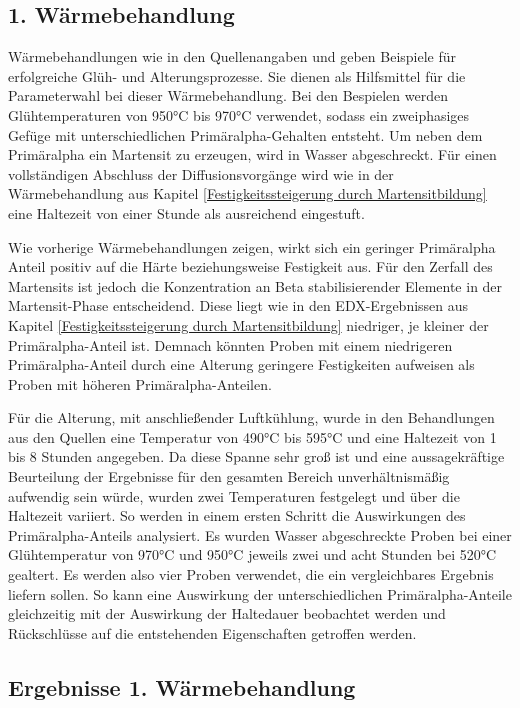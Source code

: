 \documentclass[a4paper, 11pt]{tubsreprt}
\begin{document}
\subsection{1. Wärmebehandlung}
Wärmebehandlungen wie in den Quellenangaben \cite{Gilbert2004} und \cite{Chen2008} geben Beispiele für erfolgreiche Glüh- und Alterungsprozesse. Sie dienen als Hilfsmittel für die Parameterwahl bei dieser Wärmebehandlung. Bei den Bespielen werden Glühtemperaturen von 950°C bis 970°C verwendet, sodass ein zweiphasiges Gefüge mit unterschiedlichen Primäralpha-Gehalten entsteht. Um neben dem Primäralpha ein Martensit zu erzeugen, wird in Wasser abgeschreckt. Für einen vollständigen Abschluss der Diffusionsvorgänge wird wie in der Wärmebehandlung aus Kapitel \ref{Festigkeitssteigerung durch Martensitbildung} eine Haltezeit von einer Stunde als ausreichend eingestuft.

Wie vorherige Wärmebehandlungen zeigen, wirkt sich ein geringer Primäralpha Anteil positiv auf die Härte beziehungsweise Festigkeit aus. Für den Zerfall des Martensits ist jedoch die Konzentration an Beta stabilisierender Elemente in der Martensit-Phase entscheidend. Diese liegt wie in den EDX-Ergebnissen aus Kapitel \ref{Festigkeitssteigerung durch Martensitbildung} niedriger, je kleiner der Primäralpha-Anteil ist. Demnach könnten Proben mit einem niedrigeren Primäralpha-Anteil durch eine Alterung geringere Festigkeiten aufweisen als Proben mit höheren Primäralpha-Anteilen.

Für die Alterung, mit anschließender Luftkühlung, wurde in den Behandlungen aus den Quellen eine Temperatur von 490°C bis 595°C und eine Haltezeit von 1 bis 8 Stunden angegeben. Da diese Spanne sehr groß ist und eine aussagekräftige Beurteilung der Ergebnisse für den gesamten Bereich unverhältnismäßig aufwendig sein würde, wurden zwei Temperaturen festgelegt und über die Haltezeit variiert. So werden in einem ersten Schritt die Auswirkungen des Primäralpha-Anteils analysiert. Es wurden Wasser abgeschreckte Proben bei einer Glühtemperatur von 970°C und 950°C jeweils zwei und acht Stunden bei 520°C gealtert. Es werden also vier Proben verwendet, die ein vergleichbares Ergebnis liefern sollen. So kann eine Auswirkung der unterschiedlichen Primäralpha-Anteile gleichzeitig mit der Auswirkung der Haltedauer beobachtet werden und Rückschlüsse auf die entstehenden Eigenschaften getroffen werden.
\subsection{Ergebnisse 1. Wärmebehandlung}
\end{document}

